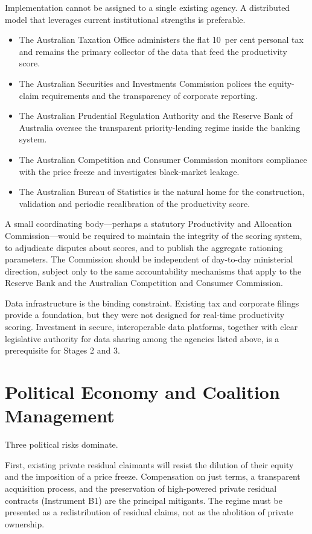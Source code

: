 \documentclass[12pt,anyside]{book}
\theoremstyle{definition}
\theoremstyle{plain}
\theoremstyle{remark}
\begin{document}
Implementation cannot be assigned to a single existing agency. A distributed model that leverages current institutional strengths is preferable.

\begin{itemize}
\item The Australian Taxation Office administers the flat 10~per cent personal tax and remains the primary collector of the data that feed the productivity score.
\item The Australian Securities and Investments Commission polices the equity-claim requirements and the transparency of corporate reporting.
\item The Australian Prudential Regulation Authority and the Reserve Bank of Australia oversee the transparent priority-lending regime inside the banking system.
\item The Australian Competition and Consumer Commission monitors compliance with the price freeze and investigates black-market leakage.
\item The Australian Bureau of Statistics is the natural home for the construction, validation and periodic recalibration of the productivity score.
\end{itemize}

A small coordinating body—perhaps a statutory Productivity and Allocation Commission—would be required to maintain the integrity of the scoring system, to adjudicate disputes about scores, and to publish the aggregate rationing parameters. The Commission should be independent of day-to-day ministerial direction, subject only to the same accountability mechanisms that apply to the Reserve Bank and the Australian Competition and Consumer Commission.

Data infrastructure is the binding constraint. Existing tax and corporate filings provide a foundation, but they were not designed for real-time productivity scoring. Investment in secure, interoperable data platforms, together with clear legislative authority for data sharing among the agencies listed above, is a prerequisite for Stages 2 and 3.

\section{Political Economy and Coalition Management}

Three political risks dominate.

First, existing private residual claimants will resist the dilution of their equity and the imposition of a price freeze. Compensation on just terms, a transparent acquisition process, and the preservation of high-powered private residual contracts (Instrument B1) are the principal mitigants. The regime must be presented as a redistribution of residual claims, not as the abolition of private ownership.
\end{document}
